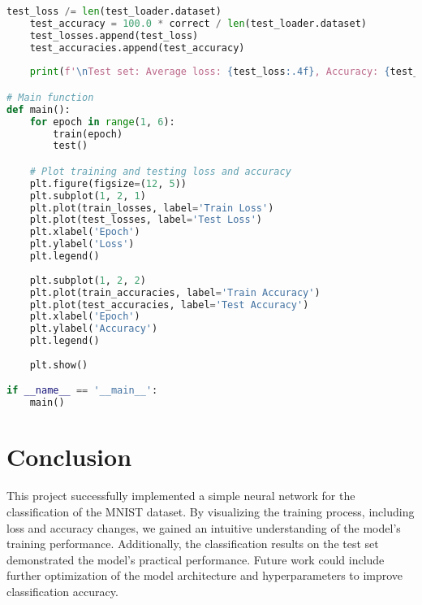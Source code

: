 \documentclass{article}
\begin{document}
\begin{lstlisting}[language=Python, basicstyle=\ttfamily\small, breaklines=true]
    test_loss /= len(test_loader.dataset)
    test_accuracy = 100.0 * correct / len(test_loader.dataset)
    test_losses.append(test_loss)
    test_accuracies.append(test_accuracy)
    
    print(f'\nTest set: Average loss: {test_loss:.4f}, Accuracy: {test_accuracy:.2f}%\n')

# Main function
def main():
    for epoch in range(1, 6):
        train(epoch)
        test()

    # Plot training and testing loss and accuracy
    plt.figure(figsize=(12, 5))
    plt.subplot(1, 2, 1)
    plt.plot(train_losses, label='Train Loss')
    plt.plot(test_losses, label='Test Loss')
    plt.xlabel('Epoch')
    plt.ylabel('Loss')
    plt.legend()
    
    plt.subplot(1, 2, 2)
    plt.plot(train_accuracies, label='Train Accuracy')
    plt.plot(test_accuracies, label='Test Accuracy')
    plt.xlabel('Epoch')
    plt.ylabel('Accuracy')
    plt.legend()
    
    plt.show()

if __name__ == '__main__':
    main()
\end{lstlisting}

\section{Conclusion}
This project successfully implemented a simple neural network for the classification of the MNIST dataset. By visualizing the training process, including loss and accuracy changes, we gained an intuitive understanding of the model's training performance. Additionally, the classification results on the test set demonstrated the model's practical performance. Future work could include further optimization of the model architecture and hyperparameters to improve classification accuracy.
\end{document}
